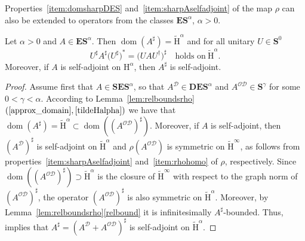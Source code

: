 \documentclass[AHL,Unicode,longabstracts,published]{cedram}
\DeclareMathOperator{\dom}{dom}
\renewcommand{\mathsf}{\mathrm}
\newcommand{\sfH}{\mathsf{H}}
\newcommand{\CD}{\mathcal{D}}
\newcommand{\CO}{\mathcal{O}}
\newcommand{\BD}{\mathbf D}
\newcommand{\BE}{\mathbf E}
\newcommand{\BS}{\mathbf S}
\renewcommand{\subseteq}{\subset}
\renewcommand{\supseteq}{\supset}
\begin{document}
Properties~\eqref{item:domsharpDES} and~\eqref{item:sharpAselfadjoint} of the map $\rho$ can also be extended to operators from the classes $\BE\BS^\alpha$, $\alpha>0$.
\begin{lemm}\label{lem:sharpWES}
Let $\alpha>0$ and $A\in\BE\BS^\alpha$. Then $\dom(A^\sharp)=\widetilde{\sfH}^\alpha$ and for all unitary $U\in\BS^0$
\begin{equation}\label{eq:Usharp*AsharpUsharp}
U^\sharp A^\sharp \big(U^\sharp\big)^* = \big(U A U^\dagger\big)^\sharp \quad \text{holds on} \ \widetilde{\sfH}^\alpha.
\end{equation}
Moreover, if $A$ is self-adjoint on $\sfH^\alpha$, then $A^\sharp$ is self-adjoint.
\end{lemm}

\begin{proof}
Assume first that $A\in\BS\BE\BS^\alpha$, so that $A^\CD\in\BD\BE\BS^\alpha$ and $A^{\CO\CD}\in\BS^\gamma$ for some $0<\gamma<\alpha$. According to Lemma~\ref{lem:relboundsrho}$(\ref{approx_domain}, \ref{tildeHalpha})$ we have that $\dom(A^\sharp)=\widetilde{\sfH}^\alpha\subseteq\dom((A^{\CO\CD})^\sharp)$. Moreover, if $A$ is self-adjoint, then $(A^\CD)^\sharp$ is self-adjoint on $\widetilde{\sfH}^\alpha$ and $\rho(A^{\CO\CD})$ is symmetric on $\widetilde{\sfH}^\infty$, as follows from properties~\eqref{item:sharpAselfadjoint} and~\eqref{item:rhohomo} of $\rho$, respectively. Since $\dom((A^{\CO\CD})^\sharp)\supseteq\widetilde{\sfH}^\alpha$ is the closure of $\widetilde{\sfH}^\infty$ with respect to the graph norm of $(A^{\CO\CD})^\sharp$, the operator $(A^{\CO\CD})^\sharp$ is also symmetric on $\widetilde{\sfH}^\alpha$. Moreover, by Lemma~\ref{lem:relboundsrho}\eqref{relbound} it is infinitesimally $A^\sharp$-bounded. Thus, \cite[Theorem~4.1.9]{BirmanSolomyak} implies that $A^\sharp=(A^\CD +A^{\CO\CD})^\sharp$ is self-adjoint on $\widetilde{\sfH}^\alpha$.


\end{proof}
\end{document}
